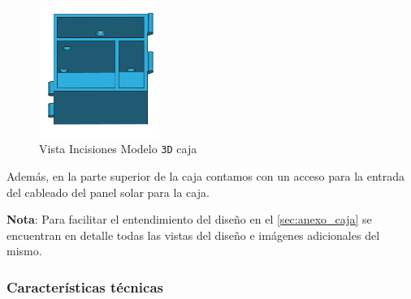 \begin{figure}[H]
    \centering
    \includegraphics[width=0.35\textwidth]{images/4-DesarrolloTeorico/4-1-caja/CAJA_3D_ACCESOS.png}
    \caption{Vista Incisiones Modelo \texttt{3D} caja}
    \label{fig:DesarrolloTeorico/Caja/CAJA_3D_ACCESOS}
\end{figure}


Además, en la parte superior de la caja contamos con un acceso para la entrada del cableado del panel solar para la caja.

\textbf{Nota}: Para facilitar el entendimiento del diseño en el \autoref{sec:anexo_caja} se encuentran en detalle todas las vistas del diseño  e imágenes adicionales del mismo.

\subsubsection{Características técnicas}

